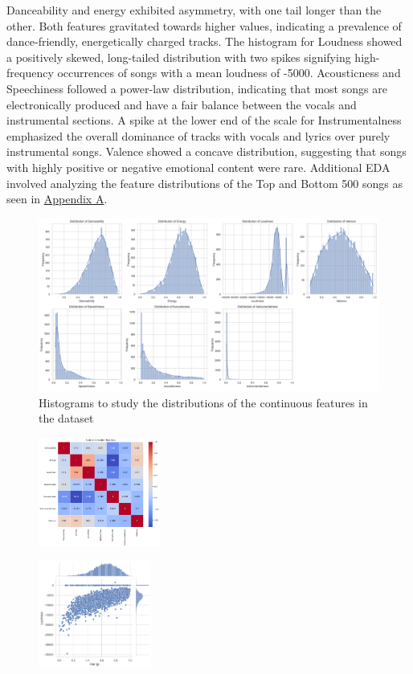 \documentclass{article}
\begin{document}
Danceability and energy exhibited asymmetry, with one tail longer than the other. Both features gravitated towards higher values, indicating a prevalence of dance-friendly, energetically charged tracks. The histogram for Loudness showed a positively skewed, long-tailed distribution with two spikes signifying high-frequency occurrences of songs with a mean loudness of -5000. Acousticness and Speechiness followed a power-law distribution, indicating that most songs are electronically produced and have a fair balance between the vocals and instrumental sections. A spike at the lower end of the scale for Instrumentalness emphasized the overall dominance of tracks with vocals and lyrics over purely instrumental songs. Valence showed a concave distribution, suggesting that songs with highly positive or negative emotional content were rare. Additional EDA involved analyzing the feature distributions of the Top and Bottom 500 songs as seen in \hyperref[app:FEATURES500]{Appendix A}.

\begin{figure}[H]
    \centering
    \includegraphics[width=0.73\linewidth]{Images/FeatureDistNew.png}
    \caption{Histograms to study the distributions of the continuous features in the dataset}
\end{figure}

\begin{figure}[H]
\centering
\begin{minipage}{.48\textwidth}
  \centering
  \includegraphics[width=40mm]{Images/Correlation HeatMap.png}
  \label{fig:testx}
\end{minipage}%
\begin{minipage}{.50\textwidth}
  \centering
  \includegraphics[width=37mm]{Images/Scatter Plott for Loudness and Energy.png}
  \label{fig:testy}
\end{minipage}
\end{figure}
\end{document}
